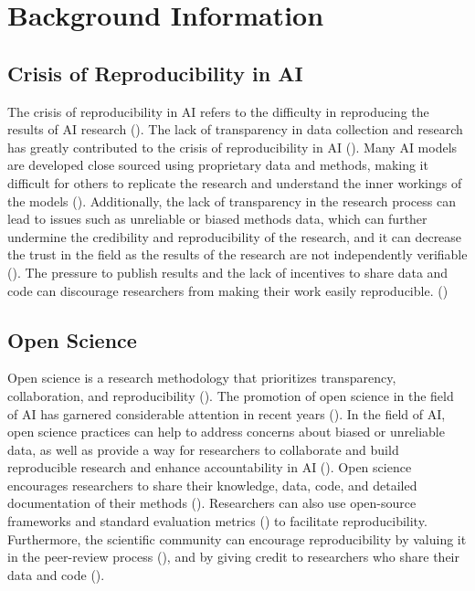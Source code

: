 
\section{Background Information}


\subsection{Crisis of Reproducibility in AI}
The crisis of reproducibility in AI refers to the difficulty in reproducing the results of AI research (\cite{gundersen2018reproducible}). The lack of transparency in data collection and research has greatly contributed to the crisis of reproducibility in AI (\cite{gundersen2018reproducible,hutson2018artificial,leakage-recrisis}). Many AI models are developed close sourced using proprietary data and methods, making it difficult for others to replicate the research and understand the inner workings of the models (\cite{gundersen2018reproducible,accountabilityInAi}). Additionally, the lack of transparency in the research process can lead to issues such as unreliable or biased methods data, which can further undermine the credibility and reproducibility of the research, and it can decrease the trust in the field as the results of the research are not independently verifiable  (\cite{accountabilityInAi,leakage-recrisis,scully-debt-ml}). The pressure to publish results and the lack of incentives to share data and code can discourage researchers from making their work easily reproducible. (\cite{psychology-reproducibility-crisis, friesike2015open,kwon2021incentive, ali2017motivating,o2017evaluation})



\subsection{Open Science}

Open science is a research methodology that prioritizes transparency, collaboration, and reproducibility (\cite{nielsen2011reinventing}). The promotion of open science in the field of AI has garnered considerable attention in recent years (\cite{accountabilityInAi,gundersen2018reproducible,leakage-recrisis,scully-debt-ml,stodden-towardreprodicibleresearch,coro2020open,braun2018open,hicks2021open,burgelman2019open}). In the field of AI, open science practices can help to address concerns about biased or unreliable data, as well as provide a way for researchers to collaborate and build reproducible research and enhance accountability in AI (\cite{accountabilityInAi,stodden-towardreprodicibleresearch}).  Open science encourages researchers to share their knowledge, data, code, and detailed documentation of their methods (\cite{hutson2018artificial,accountabilityInAi}). 
Researchers can also use open-source frameworks and standard evaluation metrics (\cite{gundersen2018reproducible}) to facilitate reproducibility. Furthermore, the scientific community can encourage reproducibility by valuing it in the peer-review process (\cite{scully-debt-ml}), and by giving credit to researchers who share their data and code (\cite{scully-debt-ml,credit-datasharing,stodden-towardreprodicibleresearch}).




